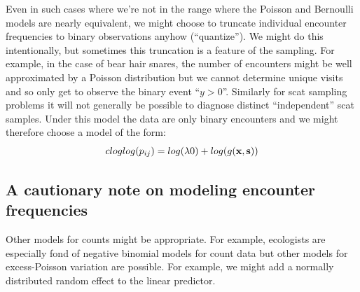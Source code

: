 Even in such cases where we're not in the range where the Poisson and
Bernoulli models are nearly equivalent, 
we might choose to truncate  individual encounter frequencies
to binary observations anyhow (``quantize'').
We might do
this intentionally, but sometimes this truncation is a feature of the
sampling. For example, in the case of bear hair snares, the number of
encounters might be well approximated by a Poisson distribution but we
cannot determine unique visits and so only get to observe the binary
event ``$y>0$''. Similarly for scat sampling problems it will not
generally be possible to diagnose distinct ``independent'' scat
samples. Under this model the data are only binary encounters and we
might therefore choose a model of the form:
\[
 cloglog(p_{ij}) = log(\lambda0)  + log(g({\bf x},{\bf s}))
\]

\subsection{A cautionary note on modeling encounter frequencies}

Other models for counts might be appropriate. For example, ecologists
are especially fond of negative binomial models for count data
\citep{verhoef_boveng:2007,
white_bennetts:1996,kery_etal:2005}
but other models for excess-Poisson variation are possible. For
example, we might add a normally distributed random effect to
the linear predictor.

